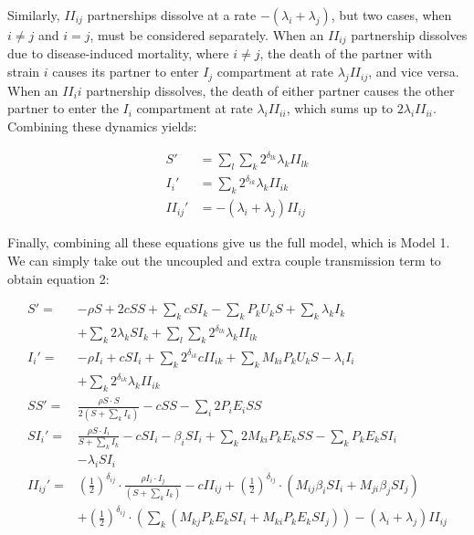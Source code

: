 \documentclass[10pt,letterpaper]{article}
\newcommand{\khalf}{\left(\frac{1}{2}\right)^{\delta_{ij}}}  %
\begin{document}
Similarly, $II_{ij}$ partnerships dissolve at a rate $-(\lambda_i + \lambda_j)$, but two cases, when $i \neq j$ and $i = j$, must be considered separately. When an $II_{ij}$ partnership dissolves due to disease-induced mortality, where $i \neq j$, the death of the partner with strain $i$ causes its partner to enter $I_j$ compartment at rate $\lambda_j II_{ij}$, and vice versa. When an $II_ii$ partnership dissolves, the death of either partner causes the other partner to enter the $I_i$ compartment at rate $\lambda_i II_{ii}$, which sums up to $2\lambda_i II_{ii}$. Combining these dynamics yields:

\begin{equation}
\begin{aligned}
S' &= \sum_l \sum_k  2^{\delta_{lk}} \lambda_k II_{lk} \\
I_i' &=  \sum_k 2^{\delta_{ik}} \lambda_k II_{ik} \\
II_{ij}' &= -(\lambda_i + \lambda_j) II_{ij}
\end{aligned}
\end{equation}

Finally, combining all these equations give us the full model, which is Model 1. We can simply take out the uncoupled and extra couple transmission term to obtain equation 2:

\begin{equation}
\begin{aligned}
S' =& - \rho S + 2 c SS + \sum_k c SI_k - \sum_k P_k U_k S + \sum_k \lambda_k I_k \\
&+ \sum_k 2 \lambda_k SI_k + \sum_l \sum_k  2^{\delta_{lk}} \lambda_k II_{lk}\\
I_i' =&  - \rho I_i + c SI_i + \sum_k 2^{\delta_{ik}} c  II_{ik} + \sum_k M_{ki} P_k U_k S- \lambda_i I_i \\
&+ \sum_k 2^{\delta_{ik}} \lambda_k II_{ik} \\
SS' =& \frac{\rho S \cdot S}{2 (S + \sum_k I_k)} - c SS - \sum_i 2 P_i E_i SS \\
SI_i' =& \frac{\rho S \cdot I_i}{S + \sum_k I_k} - c SI_i - \beta_i SI_i + \sum_k 2 M_{ki} P_k E_k SS - \sum_k P_k E_k SI_i   \\
&- \lambda_i SI_i\\
II_{ij}' =& \khalf \cdot \frac{\rho I_i \cdot I_j}{(S + \sum_k I_k)} - c II_{ij} + \khalf \cdot (M_{ij} \beta_i SI_i + M_{ji} \beta_j SI_j) \\
&+ \khalf \cdot (\sum_k (M_{kj} P_k E_k SI_i + M_{ki} P_k E_k SI_j)) -(\lambda_i + \lambda_j) II_{ij}
\end{aligned}
\end{equation}
\end{document}
